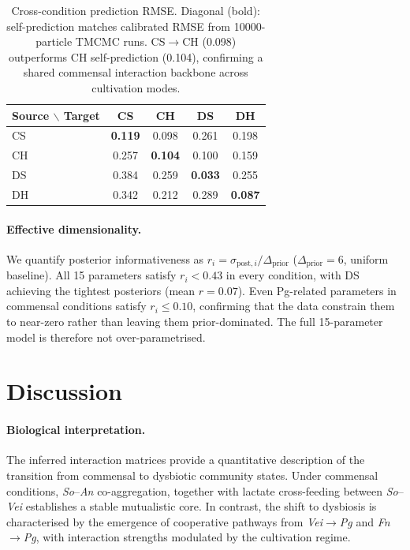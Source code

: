 \documentclass[11pt,a4paper]{article}
\begin{document}
\begin{table}[htbp]
\centering\small
\begin{tabular}{@{}lcccc@{}}
\toprule
Source $\backslash$ Target & CS & CH & DS & DH \\
\midrule
CS & \textbf{0.119} & 0.098 & 0.261 & 0.198 \\
CH & 0.257 & \textbf{0.104} & 0.100 & 0.159 \\
DS & 0.384 & 0.259 & \textbf{0.033} & 0.255 \\
DH & 0.342 & 0.212 & 0.289 & \textbf{0.087} \\
\bottomrule
\end{tabular}
\caption{Cross-condition prediction RMSE. Diagonal (bold): self-prediction matches calibrated RMSE from 10000-particle TMCMC runs. CS$\to$CH (0.098) outperforms CH self-prediction (0.104), confirming a shared commensal interaction backbone across cultivation modes.}
\label{tab:cross_prediction}
\end{table}

\paragraph{Effective dimensionality.}
We quantify posterior informativeness as $r_i = \sigma_{\mathrm{post},i} / \Delta_{\mathrm{prior}}$ ($\Delta_{\mathrm{prior}}=6$, uniform baseline).
All 15 parameters satisfy $r_i < 0.43$ in every condition, with DS achieving the tightest posteriors (mean $r=0.07$).
Even Pg-related parameters in commensal conditions satisfy $r_i \leq 0.10$, confirming that the data constrain them to near-zero rather than leaving them prior-dominated.
The full 15-parameter model is therefore not over-parametrised.

\section{Discussion}
\label{sec:discussion}

\paragraph{Biological interpretation.}
The inferred interaction matrices provide a quantitative description of the transition from commensal to dysbiotic community states.
Under commensal conditions, \textit{So}--\textit{An} co-aggregation, together with lactate cross-feeding between \textit{So}--\textit{Vei} establishes a stable mutualistic core. In contrast, the shift to dysbiosis is characterised by the emergence of cooperative pathways from \textit{Vei}$\to$\textit{Pg} and \textit{Fn}$\to$\textit{Pg}, with interaction strengths modulated by the cultivation regime.
\end{document}
